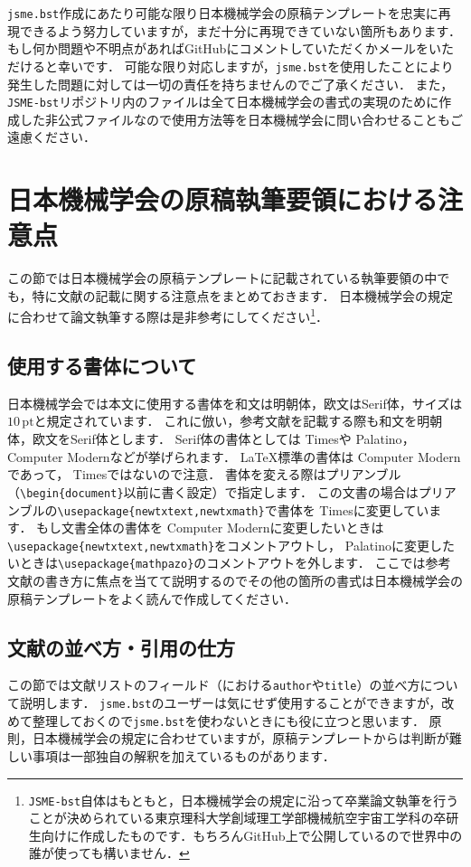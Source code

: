 \documentclass[a4paper,fleqn,uplatex,dvipdfmx]{jsarticle}
\newcommand{\jsmefile}{\texttt{jsme.bst}}
\newcommand{\JSMErepos}{\texttt{JSME-bst}}
\begin{document}
\jsmefile 作成にあたり可能な限り日本機械学会の原稿テンプレートを忠実に再現できるよう努力していますが，まだ十分に再現できていない箇所もあります．
もし何か問題や不明点があればGitHubにコメントしていただくかメールをいただけると幸いです．
可能な限り対応しますが，\jsmefile を使用したことにより発生した問題に対しては一切の責任を持ちませんのでご了承ください．
また，\JSMErepos リポジトリ内のファイルは全て日本機械学会の書式の実現のために作成した非公式ファイルなので使用方法等を日本機械学会に問い合わせることもご遠慮ください．


\section{日本機械学会の原稿執筆要領における注意点}
\label{sec:caution}
この節では日本機械学会の原稿テンプレートに記載されている執筆要領の中でも，特に文献の記載に関する注意点をまとめておきます．
日本機械学会の規定に合わせて論文執筆する際は是非参考にしてください\footnote{\JSMErepos 自体はもともと，日本機械学会の規定に沿って卒業論文執筆を行うことが決められている東京理科大学創域理工学部機械航空宇宙工学科の卒研生向けに作成したものです．もちろんGitHub上で公開しているので世界中の誰が使っても構いません．}．

\subsection{使用する書体について}
日本機械学会では本文に使用する書体を和文は明朝体，欧文はSerif体，サイズは$10\,\mathrm{pt}$と規定されています．
これに倣い，参考文献を記載する際も和文を明朝体，欧文をSerif体とします．
Serif体の書体としては{ Times}や{ Palatino}，{ Computer Modern}などが挙げられます．
\LaTeX{}標準の書体は{ Computer Modern}であって，{ Times}ではないので注意．
書体を変える際はプリアンブル（\verb|\begin{document}|以前に書く設定）で指定します．
この文書の場合はプリアンブルの\verb|\usepackage{newtxtext,newtxmath}|で書体を{ Times}に変更しています．
もし文書全体の書体を{ Computer Modern}に変更したいときは\verb|\usepackage{newtxtext,newtxmath}|をコメントアウトし，{ Palatino}に変更したいときは\verb|\usepackage{mathpazo}|のコメントアウトを外します．
ここでは参考文献の書き方に焦点を当てて説明するのでその他の箇所の書式は日本機械学会の原稿テンプレートをよく読んで作成してください．

\subsection{文献の並べ方・引用の仕方}
この節では文献リストのフィールド（\BibTeX{}における\verb|author|や\verb|title|）の並べ方について説明します．
\jsmefile のユーザーは気にせず使用することができますが，改めて整理しておくので\jsmefile を使わないときにも役に立つと思います．
原則，日本機械学会の規定に合わせていますが，原稿テンプレートからは判断が難しい事項は一部独自の解釈を加えているものがあります．
\end{document}
